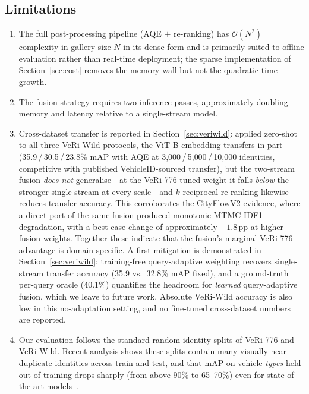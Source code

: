 \documentclass[10pt,a4paper]{article}
\begin{document}
\subsection{Limitations}
\label{sec:limitations}
\begin{enumerate}
  \item The full post-processing pipeline (AQE $+$ re-ranking) has
    $\mathcal{O}(N^{2})$ complexity in gallery size $N$ in its dense form and
    is primarily suited to offline evaluation rather than real-time deployment;
    the sparse implementation of Section~\ref{sec:cost} removes the memory wall
    but not the quadratic time growth.
  \item The fusion strategy requires two inference passes, approximately
    doubling memory and latency relative to a single-stream model.
  \item Cross-dataset transfer is reported in Section~\ref{sec:veriwild}:
    applied zero-shot to all three VeRi-Wild protocols, the ViT-B embedding
    transfers in part (35.9\,/\,30.5\,/\,23.8\% mAP with AQE at
    3{,}000\,/\,5{,}000\,/\,10{,}000 identities, competitive with published
    VehicleID-sourced transfer), but the two-stream fusion \emph{does not}
    generalise---at the VeRi-776-tuned weight it falls \emph{below} the
    stronger single stream at every scale---and $k$-reciprocal re-ranking
    likewise reduces transfer accuracy. This corroborates the CityFlowV2
    evidence, where a direct port of the same fusion produced monotonic MTMC
    IDF1 degradation, with a best-case change of approximately $-1.8$\,pp at
    higher fusion weights. Together these indicate that the fusion's marginal
    VeRi-776 advantage is domain-specific. A first mitigation is demonstrated
    in Section~\ref{sec:veriwild}: training-free query-adaptive weighting
    recovers single-stream transfer accuracy (35.9 vs.\ 32.8\% mAP fixed), and
    a ground-truth per-query oracle (40.1\%) quantifies the headroom for
    \emph{learned} query-adaptive fusion, which we leave to future work.
    Absolute VeRi-Wild accuracy is also low in this no-adaptation setting, and
    no fine-tuned cross-dataset numbers are reported.
  \item Our evaluation follows the standard random-identity splits of VeRi-776
    and VeRi-Wild. Recent analysis shows these splits contain many visually
    near-duplicate identities across train and test, and that mAP on vehicle
    \emph{types} held out of training drops sharply (from above 90\% to
    65--70\%) even for state-of-the-art models~\cite{benmabrouk2026genlimits}.

\end{enumerate}
\end{document}
